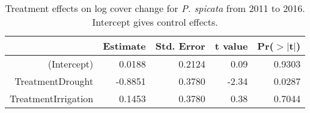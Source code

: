 \documentclass[11pt]{article}
\begin{document}
\begin{table}[ht]
	\centering
	\begin{tabular}{rrrrr}
		\hline
		& Estimate & Std. Error & t value & Pr($>$$|$t$|$) \\ 
		\hline
		(Intercept) & 0.0188 & 0.2124 & 0.09 & 0.9303 \\ 
		TreatmentDrought & -0.8851 & 0.3780 & -2.34 & 0.0287 \\ 
		TreatmentIrrigation & 0.1453 & 0.3780 & 0.38 & 0.7044 \\ 
		\hline
	\end{tabular}
	\caption{Treatment effects on log cover change for \textit{P. spicata} from 2011 to 2016. Intercept gives control effects.} 
	\label{table:changePSSP}
\end{table}
\end{document}
